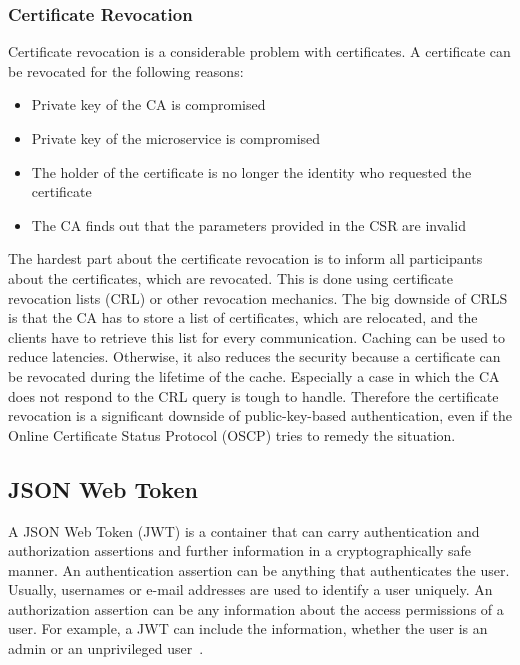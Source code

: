 \subsubsection{Certificate Revocation}
Certificate revocation is a considerable problem with certificates.
A certificate can be revocated for the following reasons: 
\begin{itemize}
    \item Private key of the CA is compromised
    \item Private key of the microservice is compromised
    \item The holder of the certificate is no longer the identity who requested the certificate 
    \item The CA finds out that the parameters provided in the CSR are invalid
\end{itemize}
The hardest part about the certificate revocation is to inform all participants about the certificates, which are revocated.
This is done using certificate revocation lists (CRL) or other revocation mechanics.
The big downside of CRLS is that the CA has to store a list of certificates, which are relocated, and the clients have to retrieve this list for every communication.
Caching can be used to reduce latencies.
Otherwise, it also reduces the security because a certificate can be revocated during the lifetime of the cache.
Especially a case in which the CA does not respond to the CRL query is tough to handle.
Therefore the certificate revocation is a significant downside of public-key-based authentication, even if the Online Certificate Status Protocol (OSCP) tries to remedy the situation\cite{dias2020microservices}.

\subsection{JSON Web Token}
A JSON Web Token (JWT) is a container that can carry authentication and authorization assertions and further information in a cryptographically safe manner.
An authentication assertion can be anything that authenticates the user.
Usually, usernames or e-mail addresses are used to identify a user uniquely.
An authorization assertion can be any information about the access permissions of a user.
For example, a JWT can include the information, whether the user is an admin or an unprivileged user~\cite{dias2020microservices}. 

